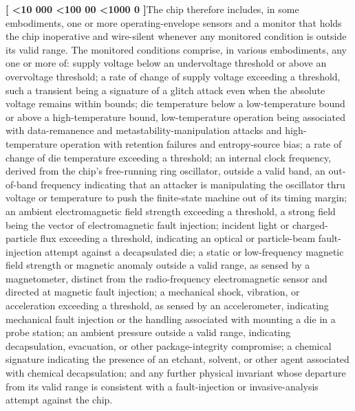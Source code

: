 \documentclass[12pt,letterpaper]{article}
\newcounter{para}
\newcommand{\padzero}{%
  \ifnum\value{para}<10 000\else%
  \ifnum\value{para}<100 00\else%
  \ifnum\value{para}<1000 0\else%
  \fi\fi\fi}
\newcommand{\para}{%
  \refstepcounter{para}\noindent\textbf{[\padzero\arabic{para}]}\hspace{0.5em}\ignorespaces}
\begin{document}
\para The chip therefore includes, in some embodiments, one or more operating-envelope sensors and a monitor that holds the chip inoperative and wire-silent whenever any monitored condition is outside its valid range. The monitored conditions comprise, in various embodiments, any one or more of: supply voltage below an undervoltage threshold or above an overvoltage threshold; a rate of change of supply voltage exceeding a threshold, such a transient being a signature of a glitch attack even when the absolute voltage remains within bounds; die temperature below a low-temperature bound or above a high-temperature bound, low-temperature operation being associated with data-remanence and metastability-manipulation attacks and high-temperature operation with retention failures and entropy-source bias; a rate of change of die temperature exceeding a threshold; an internal clock frequency, derived from the chip's free-running ring oscillator, outside a valid band, an out-of-band frequency indicating that an attacker is manipulating the oscillator thru voltage or temperature to push the finite-state machine out of its timing margin; an ambient electromagnetic field strength exceeding a threshold, a strong field being the vector of electromagnetic fault injection; incident light or charged-particle flux exceeding a threshold, indicating an optical or particle-beam fault-injection attempt against a decapsulated die; a static or low-frequency magnetic field strength or magnetic anomaly outside a valid range, as sensed by a magnetometer, distinct from the radio-frequency electromagnetic sensor and directed at magnetic fault injection; a mechanical shock, vibration, or acceleration exceeding a threshold, as sensed by an accelerometer, indicating mechanical fault injection or the handling associated with mounting a die in a probe station; an ambient pressure outside a valid range, indicating decapsulation, evacuation, or other package-integrity compromise; a chemical signature indicating the presence of an etchant, solvent, or other agent associated with chemical decapsulation; and any further physical invariant whose departure from its valid range is consistent with a fault-injection or invasive-analysis attempt against the chip.
\end{document}
